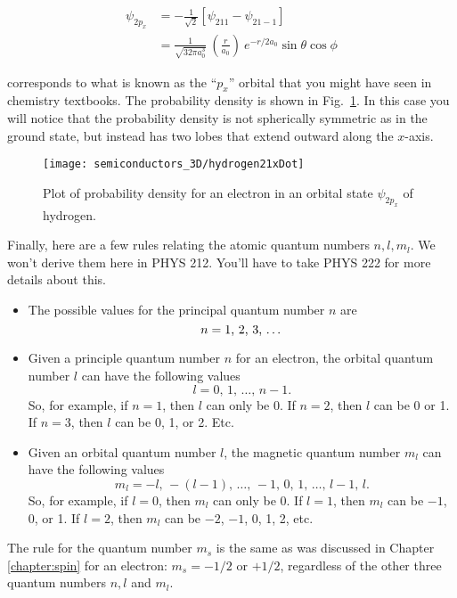 \begin{align}
  \psi_{2p_x} &= -\frac{1}{\sqrt{2}} \left[ \psi_{211} - \psi_{21-1} \right]\\
              &= \frac{1}{\sqrt{32 \pi a_0^3}}\ \left( \frac{r}{a_0} \right) \ e^{-r/2a_0} \sin{\theta} \cos{\phi}
  \nonumber
\end{align}

\noindent corresponds to what is known as the ``$p_x$'' orbital that
you might have seen in chemistry textbooks. The probability density is
shown in Fig.~\ref{fig:hydrogen21xDot}.  In this case you will notice
that the probability density is not spherically symmetric as in the
ground state, but instead has two lobes that extend outward along the
$x$-axis.

\begin{figure}
\begin{center}
\texttt{[image: semiconductors\_3D/hydrogen21xDot]}
\end{center}
\caption{Plot of probability density for an electron in an orbital state $\psi_{2p_x}$ of hydrogen.}
\label{fig:hydrogen21xDot}
\end{figure}

Finally, here are a few rules relating the atomic quantum numbers $n,
l, m_l$.  We won't derive them here in PHYS 212.  You'll have to take
PHYS 222 for more details about this.

\begin{itemize}
    \item The possible values for the principal quantum number $n$ are 
     \begin{equation}
     n = \mbox{1, 2, 3, \dots}
\end{equation}
\item Given a principle quantum number $n$ for an electron, the
  orbital quantum number $l$ can have the following values
    \begin{equation}
      l= 0,\, 1,\, \dots,\, n-1  .
    \label{eq:lquantumnumber}
    \end{equation}
    So, for example, if $n=1$, then $l$ can only be 0.  If $n=2$, then
    $l$ can be 0 or 1.  If $n=3$, then $l$ can be 0, 1, or 2.  Etc.
  \item Given an orbital quantum number $l$, the magnetic quantum
    number $m_l$ can have the following values
    \begin{equation}
      m_l=-l,\, -(l-1),\, \dots,\, -1,\, 0,\, 1,\, \dots,\, l-1,\, l  .
    \label{eq:mlquantumnumber}
    \end{equation}
    So, for example, if $l=0$, then $m_l$ can only be 0.  If $l=1$,
    then $m_l$ can be $-1$, 0, or 1.  If $l=2$, then $m_l$ can be
    $-2$, $-1$, 0, 1, 2,  etc.
\end{itemize}
The rule for the quantum number $m_s$ is the same as was discussed
in Chapter \ref{chapter:spin} for an electron: $m_s = -1/2$ or $+1/2$, 
regardless of the other three quantum numbers $n, l$ and $m_l$.

